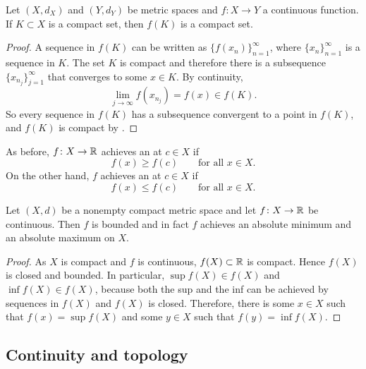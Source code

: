 \begin{lemma} \label{lemma:continuouscompact}
Let $(X,d_X)$ and $(Y,d_Y)$ be metric spaces
and $f \colon X \to Y$ a continuous function.  If
$K \subset X$ is a compact set, then $f(K)$ is a compact set.
\end{lemma}

\begin{proof}
A sequence in $f(K)$ can be written as
$\bigl\{ f(x_n) \bigr\}_{n=1}^\infty$, where
$\{ x_n \}_{n=1}^\infty$ is a sequence in $K$.  The set $K$ is compact and
therefore there is a subsequence
$\{ x_{n_j} \}_{j=1}^\infty$ that converges to some $x \in K$.
By continuity,
\begin{equation*}
\lim_{j\to\infty} f(x_{n_j}) = f(x) \in f(K) .
\end{equation*}
So every sequence in $f(K)$ has a subsequence convergent to 
a point in $f(K)$, and $f(K)$ is compact by .
\end{proof}

As before, $f \colon X \to {\mathbb{R}}$ achieves an
\emph{} at $c \in X$ if
\begin{equation*}
f(x) \geq f(c) \qquad \text{for all } x \in X.
\end{equation*}
On the other hand, $f$ achieves an 
\emph{} at $c \in X$ if
\begin{equation*}
f(x) \leq f(c) \qquad \text{for all } x \in X.
\end{equation*}

\begin{thm}
Let $(X,d)$ be a nonempty compact metric space
and let $f \colon X \to {\mathbb{R}}$ be continuous.  Then
$f$ is bounded and in fact
$f$ achieves an absolute minimum and an absolute maximum on $X$.
\end{thm}

\begin{proof}
As $X$ is compact and $f$ is continuous,
$f(X) \subset {\mathbb{R}}$ is compact.  Hence $f(X)$ is closed
and bounded.  In particular,
$\sup f(X) \in f(X)$ and
$\inf f(X) \in f(X)$, because both the sup and the inf
can be achieved by sequences in $f(X)$ and $f(X)$ is closed.
Therefore, there is some $x \in X$ such that $f(x) = \sup f(X)$
and some $y \in X$ such that $f(y) = \inf f(X)$.
\end{proof}

\subsection{Continuity and topology}

